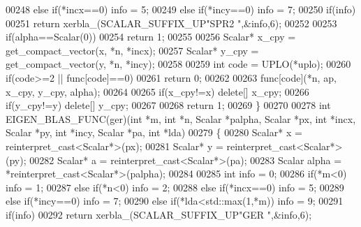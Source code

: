 \begin{DoxyCode}
00248   \textcolor{keywordflow}{else} \textcolor{keywordflow}{if}(*incx==0)                                                   info = 5;
00249   \textcolor{keywordflow}{else} \textcolor{keywordflow}{if}(*incy==0)                                                   info = 7;
00250   \textcolor{keywordflow}{if}(info)
00251     \textcolor{keywordflow}{return} xerbla\_(SCALAR\_SUFFIX\_UP\textcolor{stringliteral}{"SPR2 "},&info,6);
00252 
00253   \textcolor{keywordflow}{if}(alpha==Scalar(0))
00254     \textcolor{keywordflow}{return} 1;
00255 
00256   Scalar* x\_cpy = get\_compact\_vector(x, *n, *incx);
00257   Scalar* y\_cpy = get\_compact\_vector(y, *n, *incy);
00258 
00259   \textcolor{keywordtype}{int} code = UPLO(*uplo);
00260   \textcolor{keywordflow}{if}(code>=2 || func[code]==0)
00261     \textcolor{keywordflow}{return} 0;
00262 
00263   func[code](*n, ap, x\_cpy, y\_cpy, alpha);
00264 
00265   \textcolor{keywordflow}{if}(x\_cpy!=x)  \textcolor{keyword}{delete}[] x\_cpy;
00266   \textcolor{keywordflow}{if}(y\_cpy!=y)  \textcolor{keyword}{delete}[] y\_cpy;
00267 
00268   \textcolor{keywordflow}{return} 1;
00269 \}
00270 
00278 \textcolor{keywordtype}{int} EIGEN\_BLAS\_FUNC(ger)(\textcolor{keywordtype}{int} *m, \textcolor{keywordtype}{int} *n, Scalar *palpha, Scalar *px, \textcolor{keywordtype}{int} *incx, Scalar *py, \textcolor{keywordtype}{int} *incy, 
      Scalar *pa, \textcolor{keywordtype}{int} *lda)
00279 \{
00280   Scalar* x = \textcolor{keyword}{reinterpret\_cast<}Scalar*\textcolor{keyword}{>}(px);
00281   Scalar* y = \textcolor{keyword}{reinterpret\_cast<}Scalar*\textcolor{keyword}{>}(py);
00282   Scalar* a = \textcolor{keyword}{reinterpret\_cast<}Scalar*\textcolor{keyword}{>}(pa);
00283   Scalar alpha = *\textcolor{keyword}{reinterpret\_cast<}Scalar*\textcolor{keyword}{>}(palpha);
00284 
00285   \textcolor{keywordtype}{int} info = 0;
00286        \textcolor{keywordflow}{if}(*m<0)                                                       info = 1;
00287   \textcolor{keywordflow}{else} \textcolor{keywordflow}{if}(*n<0)                                                       info = 2;
00288   \textcolor{keywordflow}{else} \textcolor{keywordflow}{if}(*incx==0)                                                   info = 5;
00289   \textcolor{keywordflow}{else} \textcolor{keywordflow}{if}(*incy==0)                                                   info = 7;
00290   \textcolor{keywordflow}{else} \textcolor{keywordflow}{if}(*lda<std::max(1,*m))                                        info = 9;
00291   \textcolor{keywordflow}{if}(info)
00292     \textcolor{keywordflow}{return} xerbla\_(SCALAR\_SUFFIX\_UP\textcolor{stringliteral}{"GER  "},&info,6);

\end{DoxyCode}
